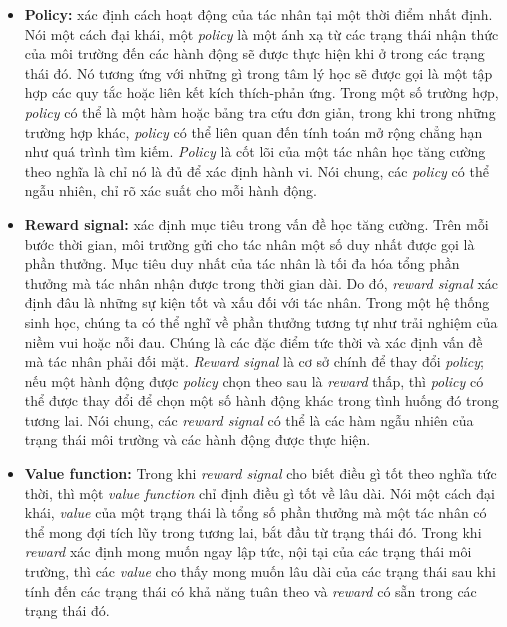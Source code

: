 \begin{itemize}
    \item \textbf{Policy:} xác định cách hoạt động của tác nhân tại
    một thời điểm nhất định. Nói một cách đại khái, một
    \textit{policy} là một ánh xạ từ các trạng thái nhận thức của
    môi trường đến các hành động sẽ được thực hiện khi ở trong các
    trạng thái đó. Nó tương ứng với những gì trong tâm lý học sẽ được
    gọi là một tập hợp các quy tắc hoặc liên kết kích thích-phản ứng.
    Trong một số trường hợp, \textit{policy} có thể là một hàm hoặc
    bảng tra cứu đơn giản, trong khi trong những trường hợp khác,
    \textit{policy} có thể liên quan đến tính toán mở rộng chẳng hạn
    như quá trình tìm kiếm. \textit{Policy} là cốt lõi của một
    tác nhân học tăng cường theo nghĩa là chỉ nó là đủ để xác định
    hành vi. Nói chung, các \textit{policy} có thể ngẫu nhiên,
    chỉ rõ xác suất cho mỗi hành động.
    \item \textbf{Reward signal:} xác định mục tiêu trong vấn đề
    học tăng cường. Trên mỗi bước thời gian, môi trường gửi cho
    tác nhân một số duy nhất được gọi là phần thưởng. Mục tiêu
    duy nhất của tác nhân là tối đa hóa tổng phần thưởng mà tác nhân
    nhận được trong thời gian dài. Do đó, \textit{reward signal}
    xác định đâu là những sự kiện tốt và xấu đối với tác nhân.
    Trong một hệ thống sinh học, chúng ta có thể nghĩ về phần thưởng
    tương tự như trải nghiệm của niềm vui hoặc nỗi đau. Chúng là các
    đặc điểm tức thời và xác định vấn đề mà tác nhân phải đối mặt.
    \textit{Reward signal} là cơ sở chính để thay đổi \textit{policy};
    nếu một hành động được \textit{policy} chọn theo sau là
    \textit{reward} thấp, thì \textit{policy} có thể được thay đổi
    để chọn một số hành động khác trong tình huống đó trong tương lai.
    Nói chung, các \textit{reward signal} có thể là các hàm ngẫu nhiên
    của trạng thái môi trường và các hành động được thực hiện.
    \item \textbf{Value function:} Trong khi \textit{reward signal}
    cho biết điều gì tốt theo nghĩa tức thời, thì một
    \textit{value function} chỉ định điều gì tốt về lâu dài.
    Nói một cách đại khái, \textit{value} của một trạng thái là tổng
    số phần thưởng mà một tác nhân có thể mong đợi tích lũy trong
    tương lai, bắt đầu từ trạng thái đó. Trong khi \textit{reward}
    xác định mong muốn ngay lập tức, nội tại của các trạng thái
    môi trường, thì các \textit{value} cho thấy mong muốn lâu dài
    của các trạng thái sau khi tính đến các trạng thái có khả năng
    tuân theo và \textit{reward} có sẵn trong các trạng thái đó.

\end{itemize}
